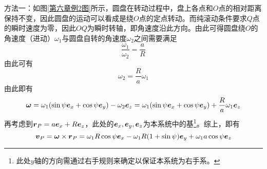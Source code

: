 \begin{solution}
{\heiti 方法一}：如图\ref{第六章例2图}所示，圆盘在转动过程中，盘上各点和$O$点的相对距离保持不变，因此圆盘的运动可以看成是绕$O$点的定点转动。而纯滚动条件要求$Q$点的瞬时速度为零，因此$OQ$为瞬时转轴，即角速度沿此方向。由此可得圆盘绕$O$的角速度（进动）$\omega_1$与圆盘自转的角速度$\omega_2$之间需要满足
\begin{equation*}
	\frac{\omega_1}{\omega_2} = \frac{a}{R}
\end{equation*}
由此可有
\begin{equation*}
	\omega_2 = \frac{R}{a} \omega_1
\end{equation*}
由此即有
\begin{equation*}
	\boldsymbol{\omega} = \omega_1 (\sin \psi \boldsymbol{e}_x + \cos \psi \boldsymbol{e}_y) - \omega_2 \boldsymbol{e}_z = \omega_1 (\sin \psi \boldsymbol{e}_x + \cos \psi \boldsymbol{e}_y) + \frac{R}{a} \omega_1 \boldsymbol{e}_z
\end{equation*}
再考虑到$\boldsymbol{r}_P = a\boldsymbol{e}_x+R\boldsymbol{e}_z$，此处的$\boldsymbol{e}_x,\boldsymbol{e}_y,\boldsymbol{e}_z$为本系统中的基\footnote{此处$y$轴的方向需通过右手规则来确定以保证本系统为右手系。}。综上，即有
\begin{equation*}
	\boldsymbol{v}_P = \boldsymbol{\omega} \times \boldsymbol{r}_P = \omega_1 R \cos \psi \boldsymbol{e}_x - \omega_1 R(1+\sin \psi) \boldsymbol{e}_y + \omega_1 a \cos \psi \boldsymbol{e}_z
\end{equation*}


\end{solution}

